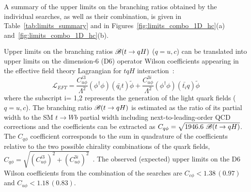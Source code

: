 A summary of the upper limits on the branching ratios obtained by the individual searches, as well as their combination, is given  
in Table~\ref{tab:limits_summary} and in Figures~\ref{fig:limits_combo_1D_hc}(a) and~\ref{fig:limits_combo_1D_hc}(b).

Upper limits on the branching ratios $\mathscr{B}(t\to qH)$ ($q=u,c$) can be translated into upper limits on the dimension-6 (D6) operator Wilson coefficients appearing in the effective field theory Lagrangian for $tqH$ interaction~\cite{fcnc_production_theory}:
%
\begin{equation}
  \mathcal{L}_{EFT} = \frac{C^{i3}_{u\phi}}{\Lambda^{2}}(\phi^{\dagger}\phi)(\bar{q_{i}}t)\tilde{\phi} + \frac{C^{3i}_{u\phi}}{\Lambda^{2}}(\phi^{\dagger}\phi)(\bar{t_{i}}q)\tilde{\phi}
  \label{eq:eq01}
\end{equation}
%
where the subscript i= 1,2 represents the generation of the light quark fields ($q=u,c$).
The branching ratio $\mathscr{B}(t\to qH)$ is estimated as the ratio of its partial width to the SM $t \to Wb$ partial width including next-to-leading-order QCD corrections and the coefficients can be extracted as $C_{q\phi} = \sqrt{1946.6~\mathscr{B}(t\to qH)}$. The $C_{q\phi}$ coefficient corresponds to the sum in quadrature of the coefficients relative to the two possible chirality combinations of the quark fields,
$C_{q\phi} =\sqrt{(C^{i3}_{u\phi})^2 + (C^{3i}_{u\phi})^2}$~\cite{fcnc_production_theory}. The observed (expected) upper limits on the D6 Wilson coefficients from the combination of the searches are $C_{c\phi}<1.38\,(0.97)$ and $C_{u\phi}<1.18\,(0.83)$. 

